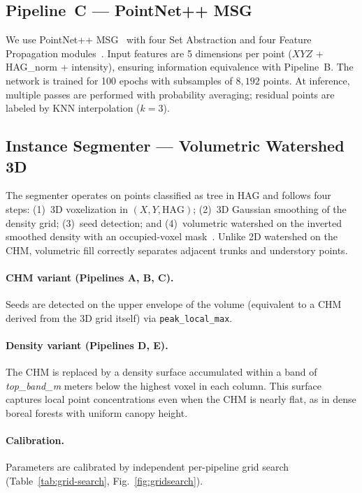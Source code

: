\documentclass[runningheads]{llncs}
\begin{document}
\subsection{Pipeline~C --- PointNet++ MSG}

We use PointNet++ MSG~\cite{qi2017} with four Set Abstraction and four Feature Propagation modules~\cite{yan2019pointnet2pytorch}. Input features are 5 dimensions per point ($XYZ$ + HAG\_norm + intensity), ensuring information equivalence with Pipeline~B. The network is trained for 100 epochs with subsamples of $8{,}192$ points. At inference, multiple passes are performed with probability averaging; residual points are labeled by KNN interpolation ($k=3$).

\subsection{Instance Segmenter --- Volumetric Watershed 3D}\label{sec:watershed}

The segmenter operates on points classified as tree in HAG and follows four steps: (1)~3D voxelization in $(X, Y, \text{HAG})$; (2)~3D Gaussian smoothing of the density grid; (3)~seed detection; and (4)~volumetric watershed on the inverted smoothed density with an occupied-voxel mask~\cite{dalponte2016}. Unlike 2D watershed on the CHM, volumetric fill correctly separates adjacent trunks and understory points.

\paragraph{CHM variant (Pipelines A, B, C).} Seeds are detected on the upper envelope of the volume (equivalent to a CHM derived from the 3D grid itself) via \texttt{peak\_local\_max}.

\paragraph{Density variant (Pipelines D, E).} The CHM is replaced by a density surface accumulated within a band of \emph{top\_band\_m} meters below the highest voxel in each column. This surface captures local point concentrations even when the CHM is nearly flat, as in dense boreal forests with uniform canopy height.

\paragraph{Calibration.}
Parameters are calibrated by independent per-pipeline grid search (Table~\ref{tab:grid-search}, Fig.~\ref{fig:gridsearch}).
\end{document}
